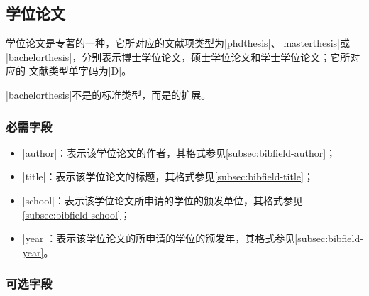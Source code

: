 
\subsection{学位论文}\label{subsec:bibtype-thesis}

学位论文是专著的一种，它所对应的{\BibTeX}文献项类型为|phdthesis|、|masterthesis|或
|bachelorthesis|，分别表示博士学位论文，硕士学位论文和学士学位论文；它所对应的
文献类型单字码为|D|\cite{gbt3469-1983}。

|bachelorthesis|不是{\BibTeX}的标准类型，而是{\njuthesis}的扩展。

\subsubsection{必需字段}

\begin{itemize}
\item |author|：表示该学位论文的作者，其格式参见\ref{subsec:bibfield-author}；
\item |title|：表示该学位论文的标题，其格式参见\ref{subsec:bibfield-title}；
\item |school|：表示该学位论文所申请的学位的颁发单位，其格式参见\ref{subsec:bibfield-school}；
\item |year|：表示该学位论文的所申请的学位的颁发年，其格式参见\ref{subsec:bibfield-year}。
\end{itemize}

\subsubsection{可选字段}

